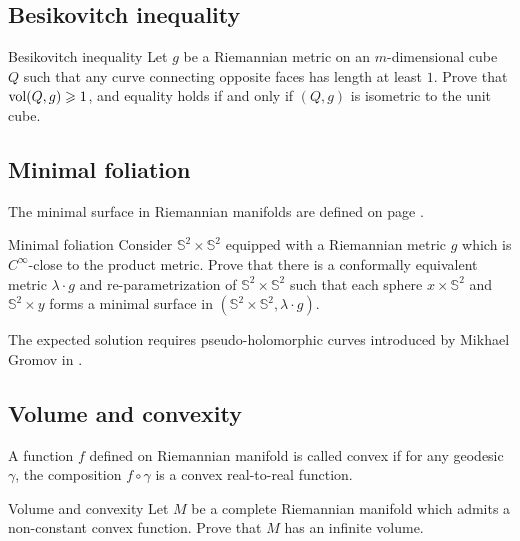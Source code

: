 \subsection*{Besikovitch inequality}

\begin{pr}{}{Besikovitch inequality}
\label{Besikovitch inequality}
Let $g$ be a Riemannian metric on an $m$-dimensional cube $Q$ such that any curve connecting opposite faces has length at least $1$. 
Prove that $\operatorname{\rm vol}(Q,g)\geqslant 1$, 
and equality holds if and only if $(Q,g)$ is isometric to the unit cube.
\end{pr}



\subsection*{Minimal foliation\thm}

The minimal surface in Riemannian manifolds are defined on page \pageref{minimal surface}.

\begin{pr}{\thm}{Minimal foliation}\label{gromomorphic-curves} 
Consider $\mathbb{S}^2\times \mathbb{S}^2$ equipped with a Riemannian metric $g$ 
which is $C^\infty$-close to the product metric. 
Prove that there is a conformally equivalent metric $\lambda\cdot g$ and re-parametrization of $\mathbb{S}^2\times \mathbb{S}^2$
such that each sphere $x\times\mathbb{S}^2$ and $\mathbb{S}^2\times y$ forms a minimal surface 
in $(\mathbb{S}^2\times \mathbb{S}^2,\lambda\cdot g)$.
\end{pr}


The expected solution requires pseudo-holomorphic curves introduced by Mikhael Gromov in \cite{gromov-pseudoholomorphic}.

\subsection*{Volume and convexity\thm}

A function $f$ defined on Riemannian manifold is called convex if for any geodesic $\gamma$, the composition $f\circ\gamma$ is a convex real-to-real function.

\begin{pr}{\thm}{Volume and convexity}
\label{Volume and convexity} 
Let
$M$ be a complete Riemannian manifold which admits a non-constant
convex function. 
Prove that $M$ has an infinite volume.
\end{pr}


